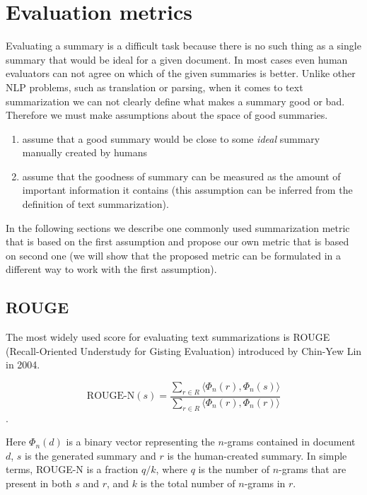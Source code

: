 \documentclass[sigplan]{acmart}
\begin{document}
\section{Evaluation metrics}
\label{sec:evaluation}

Evaluating a summary is a difficult task because there is no such thing as a single summary that would be ideal for a given document. In most cases even human evaluators can not agree on which of the given summaries is better\cite{das-7}. Unlike other NLP problems, such as translation or parsing, when it comes to text summarization we can not clearly define what makes a summary good or bad. Therefore we must make assumptions about the space of good summaries. 

\begin{enumerate}
\item assume that a good summary would be close to some \textit{ideal} summary manually created by humans
\item assume that the goodness of summary can be measured as the amount of important information it contains (this assumption can be inferred from the definition of text summarization).
\end{enumerate}

In the following sections we describe one commonly used summarization metric that is based on the first assumption and propose our own metric that is based on second one (we will show that the proposed metric can be formulated in a different way to work with the first assumption).

\subsection{ROUGE}
\label{sec:rouge}

The most widely used score for evaluating text summarizations is ROUGE (Recall-Oriented Understudy for Gisting Evaluation) introduced by Chin-Yew Lin in 2004\cite{lin-4}.

\[ \text{ROUGE-N}(s) = \frac{\sum_{r \in R} \langle \Phi_n(r), \Phi_n(s) \rangle}{\sum_{r \in R} \langle \Phi_n(r), \Phi_n(r) \rangle} \].

Here $\Phi_n(d)$ is a binary vector representing the $n$-grams contained in document $d$, $s$ is the generated summary and $r$ is the human-created summary. In simple terms, ROUGE-N is a fraction $q/k$, where $q$ is the number of $n$-grams that are present in both $s$ and $r$, and $k$ is the total number of $n$-grams in $r$. 
\end{document}
